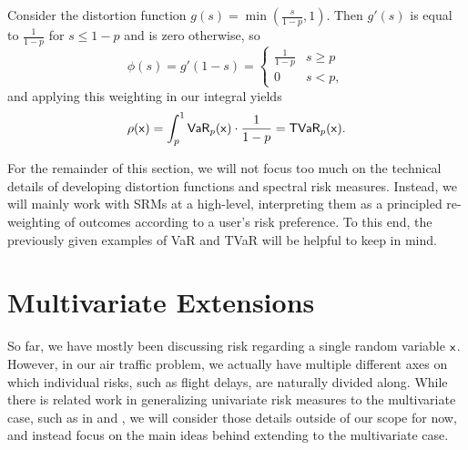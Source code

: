 \begin{example}
    Consider the distortion function $g(s) = \min(\tfrac{s}{1-p},1)$. Then $g'(s)$ is equal to $\tfrac1{1-p}$ for $s\le 1-p$ and is zero otherwise, so
    \begin{equation}
        \phi(s) = g'(1-s) = \begin{cases}
            \frac1{1-p} & s\ge p \\
            0 & s< p,
        \end{cases}
    \end{equation}
    and applying this weighting in our integral yields
    \begin{equation}
        \rs{\rx} = \int_{p}^1 \VaR{p}{\rx}\cdot \frac1{1-p}  = \TVaR{p}{\rx}.
    \end{equation}
\end{example}

For the remainder of this section, we will not focus too much on the technical details of developing distortion functions and spectral risk measures. Instead, we will mainly work with SRMs at a high-level, interpreting them as a principled re-weighting of outcomes according to a user's risk preference. To this end, the previously given examples of VaR and TVaR will be helpful to keep in mind.


\section{Multivariate Extensions}
\label{sec:risk-multi}

So far, we have mostly been discussing risk regarding a single random variable $\mathsf x$. However, in our air traffic problem, we actually have multiple different axes on which individual risks, such as flight delays, are naturally divided along. While there is related work in generalizing univariate risk measures to the multivariate case, such as in \cite{Shushi_Yao_2020} and \cite{RePEc:hal:wpaper:hal-01831481}, we will consider those details outside of our scope for now, and instead focus on the main ideas behind extending to the multivariate case.

